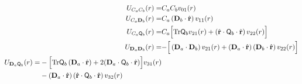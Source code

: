 %
%
%
\begin{align}
U_{C_a C_b}(r)=&
C_a C_b  v_{01}(r)  \label{uchch}
\\
%
%
U_{C_a \mathbf{D}_b}(r)=&
C_a \left( \mathbf{D}_b \cdot \hat{\mathbf{r}} \right)  v_{11}(r)  
 \label{uchdip}
\\
%
%
U_{C_a \mathsf{Q}_b}(r)=& C_a \Bigl[ \text{Tr}\mathsf{Q}_b
v_{21}(r) + \left( \hat{\mathbf{r}} \cdot \mathsf{Q}_b \cdot
  \hat{\mathbf{r}} \right) v_{22}(r) \Bigr]
\label{uchquad}
\\
%
%
%
%
U_{\mathbf{D}_a \mathbf{D}_b}(r)=&
-\Bigr[ \left( \mathbf{D}_a \cdot
\mathbf{D}_b \right)  v_{21}(r)
+\left( \mathbf{D}_a \cdot \hat{\mathbf{r}} \right)
\left( \mathbf{D}_b \cdot \hat{\mathbf{r}} \right)  
v_{22}(r) \Bigr]
\label{udipdip}
\\
%
%
\begin{split}
U_{\mathbf{D}_a \mathsf{Q}_b}(r) =&
-\Bigl[
\text{Tr}\mathsf{Q}_b
\left( \mathbf{D}_a \cdot \hat{\mathbf{r}} \right)
+2 ( \mathbf{D}_a \cdot
\mathsf{Q}_b \cdot \hat{\mathbf{r}} ) \Bigr] v_{31}(r) \\
&- \left( \mathbf{D}_a \cdot \hat{\mathbf{r}} \right)
 \left( \hat{\mathbf{r}} \cdot \mathsf{Q}_b \cdot \hat{\mathbf{r}} \right) v_{32}(r)
\label{udipquad}
\end{split}
\\
%
%
%
%

\end{align}
